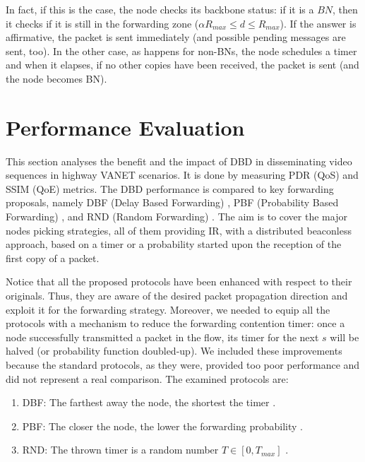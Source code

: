 \documentclass{acm_proc_article-sp}
\begin{document}
In fact, if this is the case, the node checks its backbone status: if it is a $BN$, then it checks if it is still in the forwarding zone ($\alpha R_{max} \le d \le R_{max}$). If the answer is affirmative, the packet is sent immediately (and possible pending messages are sent, too). In the other case, as happens for non-BNs, the node schedules a timer and when it elapses, if no other copies have been received, the packet is sent (and the node becomes BN).








\section{Performance Evaluation}
\label{performance}

This section analyses the benefit and the impact of DBD in disseminating video sequences in highway VANET scenarios. It is done by measuring PDR (QoS) and SSIM (QoE) metrics. The DBD performance is compared to key forwarding proposals, namely DBF (Delay Based Forwarding) \cite{DDT}, PBF (Probability Based Forwarding) \cite{PBF}, and RND (Random Forwarding) \cite{RND}.  The aim is to cover the major nodes picking strategies, all of them providing IR, with a distributed beaconless approach, based on a timer or a probability started upon the reception of the first copy of a packet.

Notice that all the proposed protocols have been enhanced with respect to their originals. Thus, they are aware of the desired packet propagation direction and exploit it for the forwarding strategy. Moreover, we needed to equip all the protocols with a mechanism to reduce the forwarding contention timer: once a node successfully transmitted a packet in the flow, its timer for the next $s$ will be halved (or probability function doubled-up). We included these improvements because the standard protocols, as they were, provided too poor performance and did not represent a real comparison.
The examined protocols are:
\begin{enumerate}
	\item DBF: The farthest away the node, the shortest the timer \cite{DDT}.
	\item PBF: The closer the node, the lower the forwarding probability \cite{PBF}.
	\item RND: The thrown timer is a random number $T \in [0,T_{max}]$ \cite{RND}.
\end{enumerate}
\end{document}
